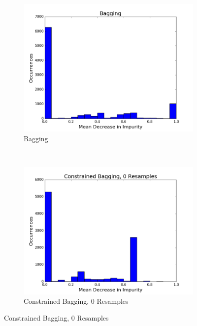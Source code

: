 \begin{figure}[H]
  \centering
  \caption{IMPURITY FOR BAGGING AND CONSTRAINED BAGGING}
  \begin{subfigure}[b]{0.45\textwidth}
    \includegraphics[width=\textwidth]{figures/random_forests/bagging_bias_bagging_hist.png}
    \caption{Bagging}
    \label{fig:bagging-bias-bagging}
  \end{subfigure}
  ~
  \begin{subfigure}[b]{0.45\textwidth}
    \includegraphics[width=\textwidth]{figures/random_forests/bagging_bias_no_bagging_hist.png}
    \caption{Constrained Bagging, 0 Resamples}
    \label{fig:bagging-bias-constrained-0}
  \end{subfigure}

\end{figure}
